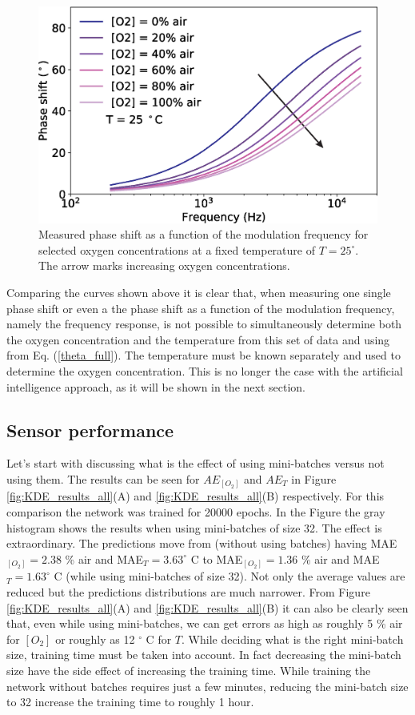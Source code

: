 \documentclass[9pt,twocolumn,twoside,pdftex]{optica}
\begin{document}
\begin{figure}[b!]
\centering
\includegraphics[width=8.2 cm]{phase_f_O2.eps}
\caption{Measured phase shift as a function of the modulation frequency for selected oxygen concentrations at a fixed temperature of $T=25 ^{\circ}$. The arrow marks increasing oxygen concentrations.}
\label{fig:expdata3}
\end{figure}

Comparing the curves shown above it is clear that, when measuring one single phase shift or even a the phase shift as a function of the modulation frequency, namely the frequency response, is not possible to simultaneously determine both the oxygen concentration and the temperature from this set of data and using from Eq. (\ref{theta_full}). The temperature must be known separately and used to determine the oxygen concentration. This is no longer the case with the artificial intelligence approach, as it will be shown in the next section. 


\subsection{Sensor performance}

Let's start with discussing what is the effect of using mini-batches versus not using them. The results can be seen for  $AE_{[O_2]}$ and $AE_T$  in Figure \ref{fig:KDE_results_all}(A) and \ref{fig:KDE_results_all}(B) respectively. For this comparison the network was trained for 20000 epochs. In the Figure the gray histogram shows the results when using mini-batches of size 32. The effect is extraordinary. The predictions move from (without using batches) having MAE$_{[O_2]}=2.38$ \% air and MAE$_{T}=3.63^\circ$ C to  
MAE$_{[O_2]}=1.36$ \% air and MAE$_{T}=1.63^\circ$ C (while using mini-batches of size 32). Not only the average values are reduced but the predictions distributions are much narrower. From Figure \ref{fig:KDE_results_all}(A) and \ref{fig:KDE_results_all}(B) it can also be clearly seen that, even while using mini-batches, we can get errors as high as roughly 5 \% air for $[O_2]$ or roughly as 12 $^\circ$ C for $T$. While deciding what is the right mini-batch size, training time must be taken into account. In fact decreasing the mini-batch size have the side effect of increasing the training time. While training the network without batches requires just a few minutes, reducing the mini-batch size to 32 increase the training time to roughly 1 hour.
\end{document}
